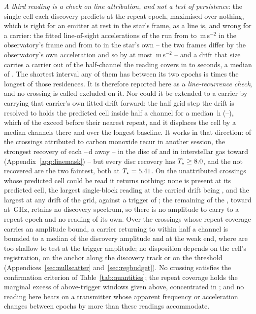 \emph{A third reading is a check on line attribution, and not a test of
persistence}: the single cell each discovery predicts at the repeat epoch,
maximised over nothing, which is right for an emitter at rest in the star's
frame, as a line is, and wrong for a carrier: the fitted line-of-sight
accelerations of the \RcNExcl{} run from \ZtALosLo{} to \ZtALosHi\,m\,s$^{-2}$
in the observatory's frame and from \EgExStarALosLo{} to \EgStarALosHi{} in the
star's own -- the two frames differ by the observatory's own acceleration and
so by at most \EgFrameALosMax\,m\,s$^{-2}$ -- and a drift that size carries a
carrier out of the half-channel the reading covers in \ZtLeaveSecLo{} to
\ZtLeaveSecHi{} seconds, a median of \ZtLeaveSecMed. The shortest interval
any of them has between its two epochs is \ZtGapOverLeaveMin{} times the
longest of those residences. It is therefore reported here as a \emph{line-recurrence check}, and
no crossing is called excluded on it. Nor could it be extended to a carrier
by carrying that carrier's own fitted drift forward: the half grid step the
drift is resolved to holds the predicted cell inside half a channel for a
median \ZtRegHoursMed\,h (\ZtRegHoursLo--\ZtRegHoursHi), which \ZtNRegNear{}
of the \RcNExcl{} exceed before their nearest repeat, and it displaces the
cell by a median \ZtRegChanMed{} channels there and \ZtRegChanFarMed{} over
the longest baseline. It works in that direction: \MkAttrRecur{} of the
\MkAttrTested{} crossings attributed to carbon monoxide recur in another
session, the strongest recovery of each \QcSepMinD--\QcSepMaxD\,d away --
\RqNRecurDisc{} in the disc of \RqRecurDiscStars{} and \RqNRecurCloud{} in
interstellar gas toward \RqRecurCloudStars{} (Appendix~\ref{app:linemask}) --
but every disc recovery has $T_\star\ge8.0$, and the
\MkAttrExcl{} not recovered are the two faintest, both at
$T_\star=5.41$. On the \RcNExclPoss{}
unattributed crossings whose predicted cell could be read it returns nothing:
none is present at its predicted cell, the largest single-block reading at the
carried drift being \RcTMatched{}, and \RcTMax{} the largest at any drift of
the grid, against a trigger of \StageNullTrig; the remaining
\RcNNoSpec{} of the \RcNTested{}, toward \RcUntStar{} at \RcUntFreq\,GHz,
retains no discovery spectrum, so there is no amplitude to carry to a repeat
epoch and no reading of its own. Over the \RcNExcl{} crossings whose repeat
coverage carries an amplitude bound, a carrier returning to within half a
channel is bounded to a median \RcFracMed{} of the discovery amplitude and
\RcFracMax{} at the weak end, where \HjNPowerLo{} are too shallow to test at the
trigger amplitude; no disposition depends on the cell's registration, on the
anchor along the discovery track or on the threshold (Appendices~\ref{sec:nullscatter} and~\ref{sec:regbudget}). No crossing satisfies the confirmation criterion of
Table~\ref{tab:quantities}; the repeat coverage holds the marginal excess of
above-trigger windows given above, concentrated in \WuTwoStars; and no reading here
bears on a transmitter whose apparent frequency or acceleration changes
between epochs by more than these readings accommodate.


